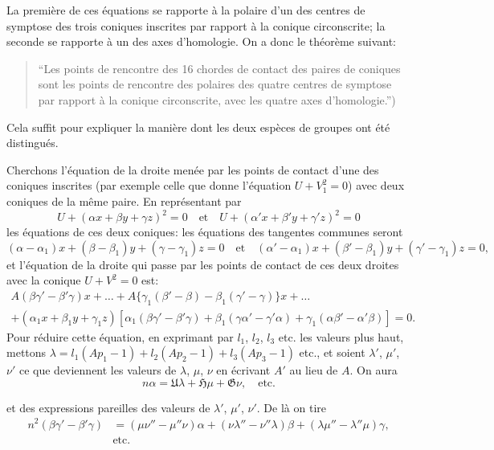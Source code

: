 \documentclass[12pt,a4paper]{article}
\theoremstyle{definition}
\begin{document}
La premi\`{e}re de ces \'{e}quations se rapporte \`{a} la polaire d'un des centres de symptose des trois coniques inscrites par rapport \`{a} la conique circonscrite; la seconde se rapporte \`{a} un des axes d'homologie. On a donc le th\'{e}or\`{e}me suivant:

\begin{quote}
``Les points de rencontre des 16 chordes de contact des paires de coniques sont les points de rencontre des polaires des quatre centres de symptose par rapport \`{a} la conique circonscrite, avec les quatre axes d'homologie.'')
\end{quote}

Cela suffit pour expliquer la mani\`{e}re dont les deux esp\`{e}ces de groupes ont \'{e}t\'{e} distingu\'{e}s.

Cherchons l'\'{e}quation de la droite men\'{e}e par les points de contact d'une des coniques inscrites (par exemple celle que donne l'\'{e}quation $U + V_1^2 = 0$) avec deux coniques de la m\^{e}me paire. En repr\'{e}sentant par
\[
U + (\alpha x + \beta y + \gamma z)^2 = 0 \quad \text{et} \quad U + (\alpha' x + \beta' y + \gamma' z)^2 = 0
\]
les \'{e}quations de ces deux coniques: les \'{e}quations des tangentes communes seront
\[
(\alpha - \alpha_1)x + (\beta - \beta_1)y + (\gamma - \gamma_1)z = 0 \quad \text{et} \quad (\alpha' - \alpha_1)x + (\beta' - \beta_1)y + (\gamma' - \gamma_1)z = 0,
\]
et l'\'{e}quation de la droite qui passe par les points de contact de ces deux droites avec la conique $U + V^2 = 0$ est:
\begin{multline*}
A(\beta\gamma' - \beta'\gamma)x + \ldots + A\{\gamma_1(\beta' - \beta) - \beta_1(\gamma' - \gamma)\}x + \ldots \\
+ (\alpha_1 x + \beta_1 y + \gamma_1 z)[\alpha_1(\beta\gamma' - \beta'\gamma) + \beta_1(\gamma\alpha' - \gamma'\alpha) + \gamma_1(\alpha\beta' - \alpha'\beta)] = 0.
\end{multline*}
Pour r\'{e}duire cette \'{e}quation, en exprimant par $l_1$, $l_2$, $l_3$ etc. les valeurs plus haut, mettons $\lambda = l_1(Ap_1 - 1) + l_2(Ap_2 - 1) + l_3(Ap_3 - 1)$ etc., et soient $\lambda'$, $\mu'$, $\nu'$ ce que deviennent les valeurs de $\lambda$, $\mu$, $\nu$ en \'{e}crivant $A'$ au lieu de $A$. On aura
\[
n\alpha = \mathfrak{U}\lambda + \mathfrak{H}\mu + \mathfrak{G}\nu, \quad \text{etc.}
\]

et des expressions pareilles des valeurs de $\lambda'$, $\mu'$, $\nu'$. De l\`{a} on tire
\begin{align*}
n^2(\beta\gamma' - \beta'\gamma) &= (\mu\nu'' - \mu''\nu)\alpha + (\nu\lambda'' - \nu''\lambda)\beta + (\lambda\mu'' - \lambda''\mu)\gamma, \\
&\text{etc.}
\end{align*}
\end{document}
